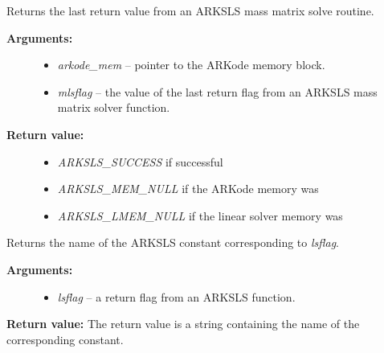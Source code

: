 \documentclass[letterpaper,10pt,english]{sphinxmanual}
\begin{document}
\begin{fulllineitems}
\label{c_interface/User_callable:ARKSlsGetLastMassFlag}
Returns the last return value from an ARKSLS mass matrix solve routine.
\begin{description}
\item[{\textbf{Arguments:}}] \leavevmode\begin{itemize}
\item {} 
\emph{arkode\_mem} -- pointer to the ARKode memory block.

\item {} 
\emph{mlsflag} -- the value of the last return flag from an ARKSLS
mass matrix solver function.

\end{itemize}

\item[{\textbf{Return value:}}] \leavevmode\begin{itemize}
\item {} 
\emph{ARKSLS\_SUCCESS} if successful

\item {} 
\emph{ARKSLS\_MEM\_NULL} if the ARKode memory was 

\item {} 
\emph{ARKSLS\_LMEM\_NULL} if the linear solver memory was 

\end{itemize}

\end{description}

\end{fulllineitems}


\begin{fulllineitems}
\label{c_interface/User_callable:ARKSlsGetReturnFlagName}
Returns the name of the ARKSLS constant
corresponding to \emph{lsflag}.
\begin{description}
\item[{\textbf{Arguments:}}] \leavevmode\begin{itemize}
\item {} 
\emph{lsflag} -- a return flag from an ARKSLS function.

\end{itemize}

\end{description}

\textbf{Return value:}  The return value is a string containing the name of
the corresponding constant.

\end{fulllineitems}
\end{document}
